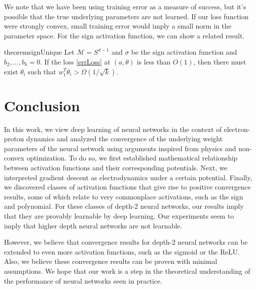 \documentclass{article}
\begin{document}
We note that we have been using training error as a measure of success, but it's possible that the true underlying parameters are not learned. If our loss function were strongly convex, small training error would imply a small norm in the parameter space. For the sign activation function, we can show a related result.

\begin{restatable}{theorem}{signUnique}
\label{SignUnique}
Let $\mathcal{M} = S^{d-1}$ and $\sigma$ be the sign activation function and $b_2,...,b_k = 0$. If the loss \eqref{errLoss} at $(a,\theta)$ is less than $O(1)$, then there must exist $\theta_i$ such that $w_1^T\theta_i > \Omega(1/\sqrt{k})$.
\end{restatable}



\section{Conclusion}

In this work, we view deep learning of neural networks in the context of electron-proton dynamics and analyzed the convergence of the underlying weight parameters of the neural network using arguments inspired from physics and non-convex optimization. To do so, we first established mathematical relationship between activation functions and their corresponding potentials. Next, we interpreted gradient descent as electrodynamics under a certain potential. Finally, we discovered classes of activation functions that give rise to positive convergence results, some of which relate to very commonplace activations, such as the sign and polynomial. For these classes of depth-2 neural networks, our results imply that they are provably learnable by deep learning. Our experiments seem to imply that higher depth neural networks are not learnable. 

However, we believe that convergence results for depth-2 neural networks can be extended to even more activation functions, such as the sigmoid or the ReLU. Also, we believe these convergence results can be proven with minimal assumptions. We hope that our work is a step in the theoretical understanding of the performance of neural networks seen in practice.






\end{document}
